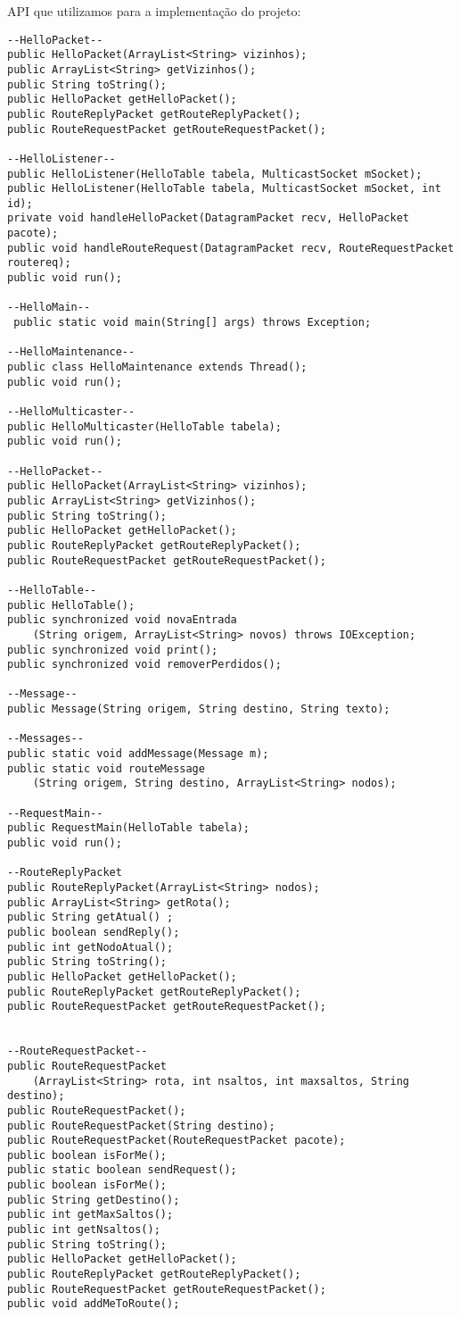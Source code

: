 \documentclass{llncs}
\begin{document}
API que utilizamos para a implementação do projeto:
\begin{verbatim}
--HelloPacket--
public HelloPacket(ArrayList<String> vizinhos);
public ArrayList<String> getVizinhos();
public String toString();
public HelloPacket getHelloPacket();
public RouteReplyPacket getRouteReplyPacket();
public RouteRequestPacket getRouteRequestPacket();

--HelloListener--
public HelloListener(HelloTable tabela, MulticastSocket mSocket);
public HelloListener(HelloTable tabela, MulticastSocket mSocket, int id);
private void handleHelloPacket(DatagramPacket recv, HelloPacket pacote);
public void handleRouteRequest(DatagramPacket recv, RouteRequestPacket routereq);
public void run();

--HelloMain--
 public static void main(String[] args) throws Exception;

--HelloMaintenance--
public class HelloMaintenance extends Thread();
public void run();

--HelloMulticaster--
public HelloMulticaster(HelloTable tabela);
public void run();

--HelloPacket--
public HelloPacket(ArrayList<String> vizinhos);
public ArrayList<String> getVizinhos();
public String toString();
public HelloPacket getHelloPacket();
public RouteReplyPacket getRouteReplyPacket();
public RouteRequestPacket getRouteRequestPacket();

--HelloTable--
public HelloTable();
public synchronized void novaEntrada
	(String origem, ArrayList<String> novos) throws IOException;
public synchronized void print();
public synchronized void removerPerdidos();

--Message--
public Message(String origem, String destino, String texto);

--Messages--
public static void addMessage(Message m);
public static void routeMessage
	(String origem, String destino, ArrayList<String> nodos);

--RequestMain--
public RequestMain(HelloTable tabela);
public void run();

--RouteReplyPacket
public RouteReplyPacket(ArrayList<String> nodos);
public ArrayList<String> getRota();
public String getAtual() ;
public boolean sendReply();
public int getNodoAtual();
public String toString();
public HelloPacket getHelloPacket();
public RouteReplyPacket getRouteReplyPacket();
public RouteRequestPacket getRouteRequestPacket();


--RouteRequestPacket--
public RouteRequestPacket
	(ArrayList<String> rota, int nsaltos, int maxsaltos, String destino);
public RouteRequestPacket();
public RouteRequestPacket(String destino);
public RouteRequestPacket(RouteRequestPacket pacote);
public boolean isForMe();
public static boolean sendRequest();
public boolean isForMe();
public String getDestino();
public int getMaxSaltos();
public int getNsaltos();
public String toString();
public HelloPacket getHelloPacket();
public RouteReplyPacket getRouteReplyPacket();
public RouteRequestPacket getRouteRequestPacket();
public void addMeToRoute();



\end{verbatim}
\end{document}
